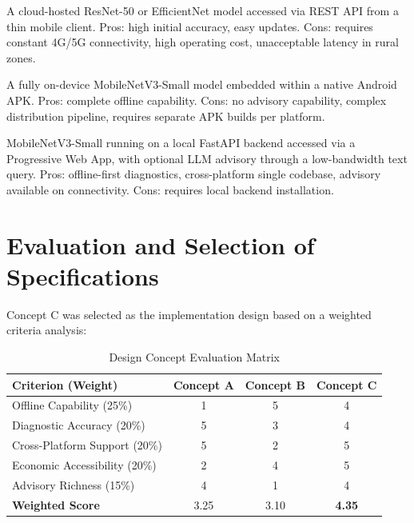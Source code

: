 \documentclass[12pt,oneside]{report}
\begin{document}
\begin{description}[leftmargin=2cm, style=nextline]
    \item[Concept A — Pure Cloud Architecture:] A cloud-hosted ResNet-50 or EfficientNet model accessed via REST API from a thin mobile client. Pros: high initial accuracy, easy updates. Cons: requires constant 4G/5G connectivity, high operating cost, unacceptable latency in rural zones.

    \item[Concept B — Edge-Only Lightweight CNN:] A fully on-device MobileNetV3-Small model embedded within a native Android APK. Pros: complete offline capability. Cons: no advisory capability, complex distribution pipeline, requires separate APK builds per platform.

    \item[Concept C — Hybrid Edge-Cloud PWA (nanoFarms):] MobileNetV3-Small running on a local FastAPI backend accessed via a Progressive Web App, with optional LLM advisory through a low-bandwidth text query. Pros: offline-first diagnostics, cross-platform single codebase, advisory available on connectivity. Cons: requires local backend installation.
\end{description}

\section{Evaluation and Selection of Specifications}
Concept C was selected as the implementation design based on a weighted criteria analysis:

\begin{table}[H]
\centering
\caption{Design Concept Evaluation Matrix}
\begin{tabular}{@{}lccc@{}}
\toprule
\textbf{Criterion (Weight)} & \textbf{Concept A} & \textbf{Concept B} & \textbf{Concept C} \\ \midrule
Offline Capability (25\%)  & 1 & 5 & 4 \\
Diagnostic Accuracy (20\%) & 5 & 3 & 4 \\
Cross-Platform Support (20\%) & 5 & 2 & 5 \\
Economic Accessibility (20\%) & 2 & 4 & 5 \\
Advisory Richness (15\%)   & 4 & 1 & 4 \\ \midrule
\textbf{Weighted Score}    & 3.25 & 3.10 & \textbf{4.35} \\ \bottomrule
\end{tabular}
\end{table}
\end{document}
